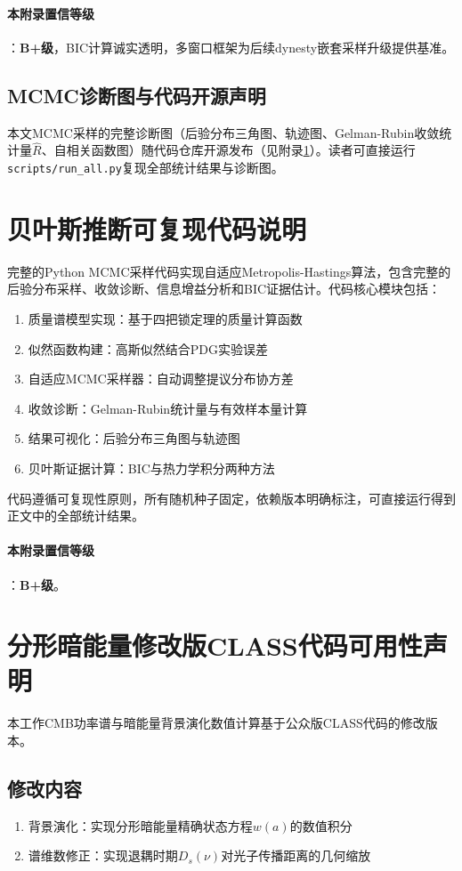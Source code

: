 \documentclass[12pt,a4paper,twocolumn]{article}
\begin{document}
\paragraph{本附录置信等级}：\textbf{B+级}，BIC计算诚实透明，多窗口框架为后续dynesty嵌套采样升级提供基准。

\subsection{MCMC诊断图与代码开源声明}
本文MCMC采样的完整诊断图（后验分布三角图、轨迹图、Gelman-Rubin收敛统计量$\hat{R}$、自相关函数图）随代码仓库开源发布（见附录\ref{app:code}）。读者可直接运行\texttt{scripts/run\_all.py}复现全部统计结果与诊断图。

\section{贝叶斯推断可复现代码说明}
\label{app:code}

完整的Python MCMC采样代码实现自适应Metropolis-Hastings算法，包含完整的后验分布采样、收敛诊断、信息增益分析和BIC证据估计。代码核心模块包括：
\begin{enumerate}
\item 质量谱模型实现：基于四把锁定理的质量计算函数
\item 似然函数构建：高斯似然结合PDG实验误差
\item 自适应MCMC采样器：自动调整提议分布协方差
\item 收敛诊断：Gelman-Rubin统计量与有效样本量计算
\item 结果可视化：后验分布三角图与轨迹图
\item 贝叶斯证据计算：BIC与热力学积分两种方法
\end{enumerate}

代码遵循可复现性原则，所有随机种子固定，依赖版本明确标注，可直接运行得到正文中的全部统计结果。

\paragraph{本附录置信等级}：\textbf{B+级}。

\section{分形暗能量修改版CLASS代码可用性声明}
\label{app:class_code}

本工作CMB功率谱与暗能量背景演化数值计算基于公众版CLASS代码的修改版本。

\subsection{修改内容}
\begin{enumerate}
\item 背景演化：实现分形暗能量精确状态方程$w(a)$的数值积分
\item 谱维数修正：实现退耦时期$D_s(\nu)$对光子传播距离的几何缩放
\end{enumerate}
\end{document}
